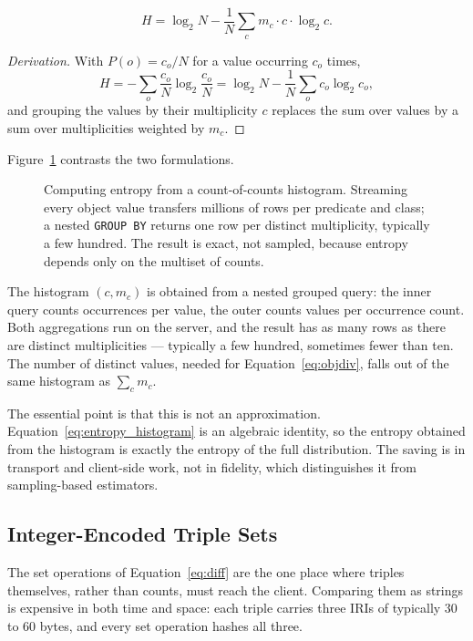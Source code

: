 \begin{equation}
  H = \log_2 N - \frac{1}{N} \sum_{c} m_c \cdot c \cdot \log_2 c.
  \label{eq:entropy_histogram}
\end{equation}

\begin{proof}[Derivation]
With $P(o) = c_o / N$ for a value occurring $c_o$ times,
\[
  H = -\sum_{o} \frac{c_o}{N} \log_2 \frac{c_o}{N}
    = \log_2 N - \frac{1}{N} \sum_{o} c_o \log_2 c_o ,
\]
and grouping the values by their multiplicity $c$ replaces the sum over values
by a sum over multiplicities weighted by $m_c$.
\end{proof}

Figure~\ref{fig:histogram} contrasts the two formulations.

\begin{figure}[htbp]
  \centering
  \fighistogram
  \caption[]{Computing entropy from a count-of-counts
    histogram. Streaming every object value transfers millions of rows per
    predicate and class; a nested \texttt{GROUP BY} returns one row per distinct
    multiplicity, typically a few hundred. The result is exact, not sampled,
    because entropy depends only on the multiset of counts.}
  \label{fig:histogram}
\end{figure}

The histogram $(c, m_c)$ is obtained from a nested grouped query: the inner query
counts occurrences per value, the outer counts values per occurrence count. Both
aggregations run on the server, and the result has as many rows as there are
distinct multiplicities --- typically a few hundred, sometimes fewer than ten.
The number of distinct values, needed for Equation~\ref{eq:objdiv}, falls out of
the same histogram as $\sum_c m_c$.

The essential point is that this is not an approximation. Equation~\ref{eq:entropy_histogram}
is an algebraic identity, so the entropy obtained from the histogram is exactly
the entropy of the full distribution. The saving is in transport and client-side
work, not in fidelity, which distinguishes it from sampling-based estimators.

\subsection{Integer-Encoded Triple Sets}
\label{subsec:integer_encoding}

The set operations of Equation~\ref{eq:diff} are the one place where triples
themselves, rather than counts, must reach the client. Comparing them as strings
is expensive in both time and space: each triple carries three \acp{IRI} of
typically 30 to 60 bytes, and every set operation hashes all three.

